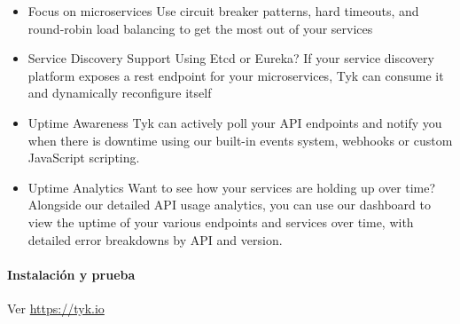 \begin{itemize}
  \item Focus on microservices Use circuit breaker patterns, hard timeouts, and round-robin load balancing to get the most out of your services
  \item Service Discovery Support Using Etcd or Eureka? If your service discovery platform exposes a rest endpoint for your microservices, Tyk can consume it and dynamically reconfigure itself
  \item Uptime Awareness Tyk can actively poll your API endpoints and notify you when there is downtime using our built-in events system, webhooks or custom JavaScript scripting.
  \item Uptime Analytics Want to see how your services are holding up over time? Alongside our detailed API usage analytics, you can use our dashboard to view the uptime of your various endpoints and services over time, with detailed error breakdowns by API and version.
\end{itemize}

\paragraph{Instalación y prueba}

Ver \url{https://tyk.io}
